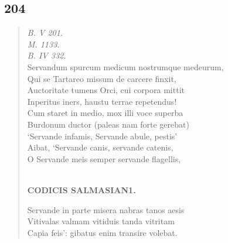\documentclass[11pt, a4paper]{report}
\begin{document}
            \subsection*{204}
      \begin{verse}
      \textit{B. V 201.} \\ \textit{M. 1133.} \\ \textit{B. IV 332.} \\ Servandum spurcum medicum nostrumque medeurum, \\ Qui se Tartareo missum de carcere finxit, \\ Auctoritate tumens Orci, cui corpora mittit \\ Inperitus iners, haustu terrae repetendus! \\ Cum staret in medio, mox illi voce superba \\ Burdonum ductor (paleas nam forte gerebat) \\ ‘Servande infamis, Servande abule, pestis’ \\ Aibat, ‘Servande canis, servande catenis, \\ O Servande meis semper servande flagellis, \\ 
        ﻿\pagebreak 
    \begin{center} \textbf{CODICIS SALMASIAN1.} \end{center} \marginpar{[177]} Servande in parte misera nabras tanos aesis \\ Vitivalas valmam vitiduis tanda vitritam \\ Capia feis’: gibatus enim transire volebat. \\ 
      \end{verse}
  
\end{document}
